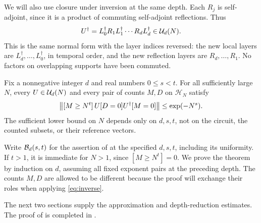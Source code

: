 We will also use closure under inversion at the same depth. Each
\(R_j\) is self-adjoint, since it is a product of commuting
self-adjoint reflections. Thus
\begin{equation}
\label{eq:inverse}
 U^\dagger=L_0^\dagger R_1L_1^\dagger\cdots R_dL_d^\dagger
 \in\mathcal U_d(N).
\end{equation}
This is the same normal form with the layer indices reversed: the new
local layers are $L_d^\dagger,\ldots,L_0^\dagger$, in temporal order,
and the new reflection layers are $R_d,\ldots,R_1$. No factors on
overlapping supports have been commuted.

\begin{theorem}
\label{thm:localization}
Fix a nonnegative integer \(d\) and real numbers \(0\le s<t\).
For all sufficiently large \(N\), every \(U\in\mathcal U_d(N)\) and every
pair of counts \(M,D\) on \(\mathcal H_N\) satisfy
\begin{equation}
\label{eq:localization}
 \left\lVert [M\ge N^t]\,U[D=0]U^\dagger[M=0]\right\rVert
 \le \exp(-N^s).
\end{equation}
The sufficient lower bound on \(N\) depends only on \(d,s,t\), not
on the circuit, the counted subsets, or their reference vectors.
\end{theorem}

Write \(\mathcal B_d(s,t)\) for the assertion of
 at the specified \(d,s,t\), including its
uniformity. If \(t>1\), it is immediate for \(N>1\), since
\([M\ge N^t]=0\). We prove the theorem by induction on \(d\), assuming
all fixed exponent pairs at the preceding depth.
The counts \(M,D\) are allowed to be different because the proof
will exchange their roles when applying \eqref{eq:inverse}.

The next two sections supply the approximation and depth-reduction
estimates. The proof of  is completed in
.
